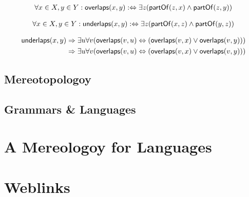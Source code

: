 \documentclass[runningheads,a4paper]{llncs}
\newcommand{\partOf}{\text{\textsf{partOf}}}
\begin{document}
\newcommand{\overlap}{\text{\textsf{overlaps}}}
\newcommand{\underlap}{\text{\textsf{underlaps}}}

\begin{definition}[Overlap]

\begin{align*}
\forall x \in X, y \in Y: \text{\textsf{overlaps}}(x,y) :\Leftrightarrow \exists z (\partOf(z,x) \wedge \partOf(z,y))
\end{align*}

\end{definition}

\begin{definition}[Underlap]

\begin{align*}
\forall x \in X, y \in Y: \text{\textsf{underlaps}}(x,y) :\Leftrightarrow \exists z (\partOf(x,z) \wedge \partOf(y,z))
\end{align*}

\end{definition}


\begin{definition}[Sum]

\begin{align*}
\underlap(x,y) 
&\Rightarrow \exists u \forall v (\overlap(v,u) \Leftrightarrow (\overlap(v,x) \vee \overlap(v,y))) \\
&\Rightarrow \exists u \forall v (\overlap(v,u) \Leftrightarrow (\overlap(v,x) \vee \overlap(v,y))) \\
\end{align*}

\end{definition}

\subsection{Mereotopologoy}


\subsection{Grammars \& Languages}

\section{A Mereologoy for Languages}


\section{Weblinks}
\end{document}
